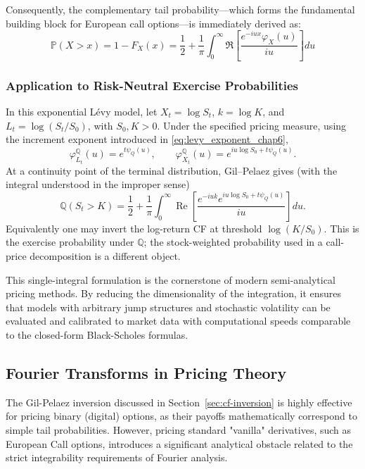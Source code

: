 Consequently, the complementary tail probability---which forms the fundamental building block for European call options---is immediately derived as:
\begin{equation}\label{eq:gil_pelaez_tail}
    \mathbb{P}(X > x) = 1 - F_X(x) = \frac{1}{2} + \frac{1}{\pi} \int_{0}^{\infty} \Re \left[ \frac{e^{-iux} \varphi_X(u)}{iu} \right] du
\end{equation}
\subsubsection{Application to Risk-Neutral Exercise Probabilities}

In this exponential L\'evy model, let $X_t=\log S_t$,
$k=\log K$, and $L_t=\log(S_t/S_0)$, with $S_0,K>0$. Under the
specified pricing measure, using the increment exponent introduced
in \eqref{eq:levy_exponent_chap6},
\[
\varphi_{L_t}^{\mathbb Q}(u)=e^{t\psi_Q(u)},\qquad
\varphi_{X_t}^{\mathbb Q}(u)=e^{iu\log S_0+t\psi_Q(u)}.
\]
At a continuity point of the terminal distribution, Gil--Pelaez gives
(with the integral understood in the improper sense)
\begin{equation}
\mathbb Q(S_t>K)=\frac12+\frac1\pi\int_0^\infty
\operatorname{Re}\!\left[
\frac{e^{-iuk}e^{iu\log S_0+t\psi_Q(u)}}{iu}
\right]du.
\end{equation}
Equivalently one may invert the log-return CF at threshold
$\log(K/S_0)$. This is the exercise probability under $\mathbb Q$;
the stock-weighted probability used in a call-price decomposition is
a different object.

This single-integral formulation is the cornerstone of modern semi-analytical pricing methods. By reducing the dimensionality of the integration, it ensures that models with arbitrary jump structures and stochastic volatility can be evaluated and calibrated to market data with computational speeds comparable to the closed-form Black-Scholes formulas.
\subsection{Fourier Transforms in Pricing Theory}

The Gil-Pelaez inversion discussed in Section~\ref{sec:cf-inversion} is highly effective for pricing binary (digital) options, as their payoffs mathematically correspond to simple tail probabilities. However, pricing standard "vanilla" derivatives, such as European Call options, introduces a significant analytical obstacle related to the strict integrability requirements of Fourier analysis.
